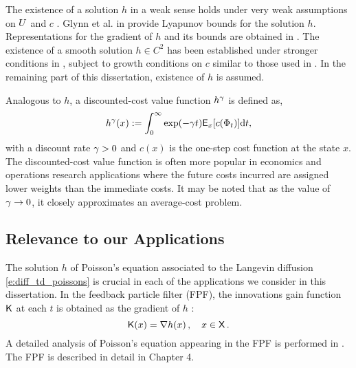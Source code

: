 The existence of a solution $h$ in a weak sense holds under very weak assumptions on $U$ and $c$  \cite{glymey96a,konmey12a}.  Glynn et al. in \cite{glymey96a} provide Lyapunov bounds for the solution $h$.  Representations for the gradient of $h$ and its bounds are obtained in \cite{laumehmeyrag15,devkonmey17b}.   The existence of  a  smooth solution $h\in C^2$ has been established under stronger conditions in \cite{parver01}, subject to growth conditions on $c$ similar to those used in  \cite{glymey96a}. In the remaining part of this dissertation, existence of $h$ is assumed. 

Analogous to $h$, a discounted-cost value function $h^\gamma$ is defined as,
\begin{equation}
h^\discount(x) := \int_0^\infty \exp(-\discount t )\Expect_x[c(\markovstate_t)] \ud t, 
\label{e:diff_td_discount_value_fn}
\end{equation}
with a discount rate $\gamma  >0$ and $c(x)$ is the one-step cost function at the state $x$. The discounted-cost value function is often more popular in economics and operations research applications where the future costs incurred are assigned lower weights than the immediate costs. It may be noted that as the value of $\gamma \to 0$, it closely approximates an average-cost problem. 

\subsection{Relevance to our Applications} 
The solution $h$ of Poisson's equation associated to the Langevin diffusion \eqref{e:diff_td_poissons} is crucial in each of the applications we consider in this dissertation. In the feedback particle filter (FPF), the innovations gain function $\text{\sf K}$ at each $t$ is obtained as  the gradient of $h$ \cite{yanmehmey13}:
\begin{equation}
\kFPF (x) = \nabla h(x)\, ,  \quad x\in\state\, .
\label{e:diff_td_fpfgain}
\end{equation}
A detailed analysis of Poisson's equation appearing in the FPF is performed in \cite{laumehmeyrag15}. The FPF is described in detail in Chapter 4. %

